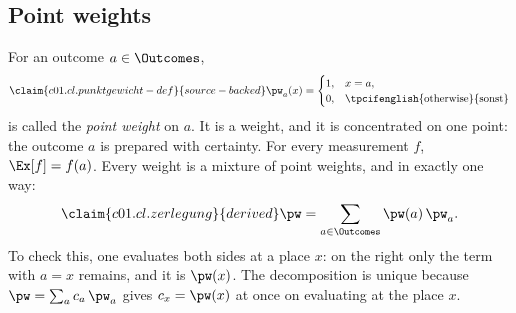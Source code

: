 \subsection{Point weights}\label{c01.s3.1}

For an outcome $a \in \Outcomes$,
\begin{equation}\label{c01.eq.punktgewicht}\claim{c01.cl.punktgewicht-def}{source-backed}
  \pw_a(x) =
  \begin{cases}
    1, & x = a, \\
    0, & \text{\tpcifenglish{otherwise}{sonst}}
  \end{cases}
\end{equation}
is called the \emph{point weight} on $a$. It is a weight, and it is concentrated on one
point: the outcome $a$ is prepared with certainty. For every measurement $f$,
$\Ex[f] = f(a)$. Every weight is a mixture of point weights, and in exactly one way:
\begin{equation}\label{c01.eq.zerlegung}\claim{c01.cl.zerlegung}{derived}
  \pw = \sum_{a \in \Outcomes} \pw(a)\, \pw_a .
\end{equation}
To check this, one evaluates both sides at a place $x$: on the right only the term with
$a = x$ remains, and it is $\pw(x)$. The decomposition is unique because
$\pw = \sum_a c_a\, \pw_a$ gives $c_x = \pw(x)$ at once on evaluating at the place $x$.

